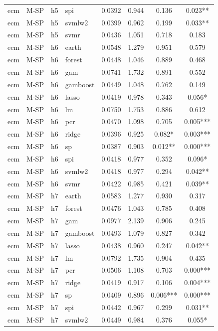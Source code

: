 \begin{ThreePartTable}
\begin{longtable}[t]{llclcccc}
ecm & M-SP & h5 & spi & 0.0392 & 0.944 & 0.136 & 0.023**\\
ecm & M-SP & h5 & svmlw2 & 0.0399 & 0.962 & 0.199 & 0.033**\\
ecm & M-SP & h5 & svmr & 0.0436 & 1.051 & 0.718 & 0.183\\
\addlinespace
ecm & M-SP & h6 & earth & 0.0548 & 1.279 & 0.951 & 0.579\\
ecm & M-SP & h6 & forest & 0.0448 & 1.046 & 0.889 & 0.468\\
ecm & M-SP & h6 & gam & 0.0741 & 1.732 & 0.891 & 0.552\\
ecm & M-SP & h6 & gamboost & 0.0449 & 1.048 & 0.762 & 0.149\\
ecm & M-SP & h6 & lasso & 0.0419 & 0.978 & 0.343 & 0.056*\\
ecm & M-SP & h6 & lm & 0.0750 & 1.753 & 0.886 & 0.612\\
ecm & M-SP & h6 & pcr & 0.0470 & 1.098 & 0.705 & 0.005***\\
ecm & M-SP & h6 & ridge & 0.0396 & 0.925 & 0.082* & 0.003***\\
ecm & M-SP & h6 & sp & 0.0387 & 0.903 & 0.012** & 0.000***\\
ecm & M-SP & h6 & spi & 0.0418 & 0.977 & 0.352 & 0.096*\\
ecm & M-SP & h6 & svmlw2 & 0.0418 & 0.977 & 0.294 & 0.042**\\
ecm & M-SP & h6 & svmr & 0.0422 & 0.985 & 0.421 & 0.039**\\
\addlinespace
ecm & M-SP & h7 & earth & 0.0583 & 1.277 & 0.930 & 0.317\\
ecm & M-SP & h7 & forest & 0.0476 & 1.043 & 0.785 & 0.408\\
ecm & M-SP & h7 & gam & 0.0977 & 2.139 & 0.906 & 0.245\\
ecm & M-SP & h7 & gamboost & 0.0493 & 1.079 & 0.827 & 0.342\\
ecm & M-SP & h7 & lasso & 0.0438 & 0.960 & 0.247 & 0.042**\\
ecm & M-SP & h7 & lm & 0.0792 & 1.735 & 0.904 & 0.435\\
ecm & M-SP & h7 & pcr & 0.0506 & 1.108 & 0.703 & 0.000***\\
ecm & M-SP & h7 & ridge & 0.0419 & 0.917 & 0.106 & 0.004***\\
ecm & M-SP & h7 & sp & 0.0409 & 0.896 & 0.006*** & 0.000***\\
ecm & M-SP & h7 & spi & 0.0442 & 0.967 & 0.299 & 0.031**\\
ecm & M-SP & h7 & svmlw2 & 0.0449 & 0.984 & 0.376 & 0.055*\\

\end{longtable}
\end{ThreePartTable}
